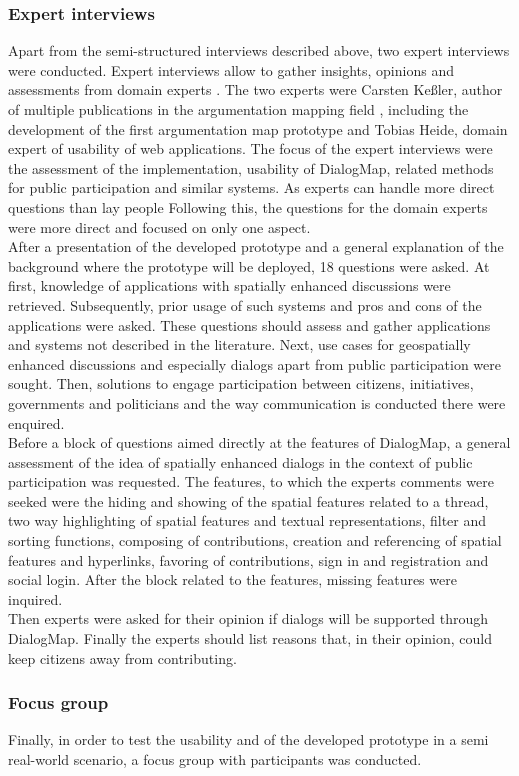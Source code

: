 \subsubsection{Expert interviews}

Apart from the semi-structured interviews described above, two expert interviews were conducted. Expert interviews allow to gather insights, opinions and assessments from domain experts \cite{hopf20045}. The two experts were Carsten Ke{\ss}ler, author of multiple publications in the argumentation mapping field \cite{Kessler2005_ArgumentationMapPrototype,kessler_argumap,Kessler2005_Conflict_Resolution}, including the development of the first argumentation map prototype and Tobias Heide, domain expert of usability of web applications. The focus of the expert interviews were the assessment of the implementation, usability of DialogMap, related methods for public participation and similar systems. As experts can handle more direct questions than lay people \cite{helfferich2005} Following this, the questions for the domain experts were more direct and focused on only one aspect.\\
After a presentation of the developed prototype and a general explanation of the background where the prototype will be deployed, 18 questions were asked. At first, knowledge of applications with spatially enhanced discussions were retrieved. Subsequently, prior usage of such systems and pros and cons of the applications were asked. These questions should assess and gather applications and systems not described in the literature. Next, use cases for geospatially enhanced discussions and especially dialogs apart from public participation were sought. Then, solutions to engage participation between citizens, initiatives, governments and politicians and the way communication is conducted there were enquired.\\
Before a block of questions aimed directly at the features of DialogMap, a general assessment of the idea of spatially enhanced dialogs in the context of public participation was requested. The features, to which the experts comments were seeked were the hiding and showing of the spatial features related to a thread, two way highlighting of spatial features and textual representations, filter and sorting functions, composing of contributions, creation and referencing of spatial features and hyperlinks, favoring of contributions, sign in and registration and social login. After the block related to the features, missing features were inquired.\\
Then experts were asked for their opinion if dialogs will be supported through DialogMap. Finally the experts should list reasons that, in their opinion, could keep citizens away from contributing.

\subsubsection{Focus group}

Finally, in order to test the usability and  of the developed prototype in a semi real-world scenario, a focus group with  participants was conducted. 


